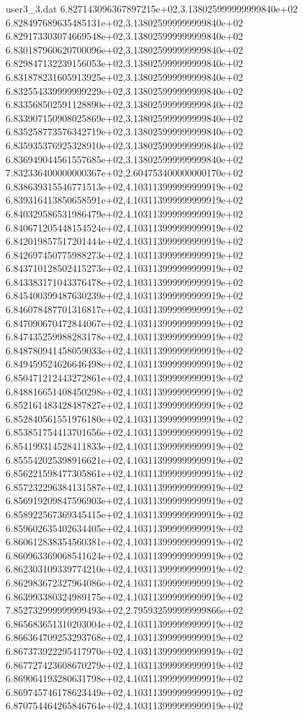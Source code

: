 \begin{filecontents}{user3_3.dat}
6.827143096367897215e+02,3.138025999999999840e+02
6.828497689635485131e+02,3.138025999999999840e+02
6.829173303074669548e+02,3.138025999999999840e+02
6.830187960620700096e+02,3.138025999999999840e+02
6.829847132239156053e+02,3.138025999999999840e+02
6.831878231605913925e+02,3.138025999999999840e+02
6.832554339999999229e+02,3.138025999999999840e+02
6.833568502591128890e+02,3.138025999999999840e+02
6.833907150908025869e+02,3.138025999999999840e+02
6.835258773576342719e+02,3.138025999999999840e+02
6.835935376925328910e+02,3.138025999999999840e+02
6.836949044561557685e+02,3.138025999999999840e+02
7.832336400000000367e+02,2.604753400000000170e+02
6.838639315546771513e+02,4.103113999999999919e+02
6.839316413850658591e+02,4.103113999999999919e+02
6.840329586531986479e+02,4.103113999999999919e+02
6.840671205448154524e+02,4.103113999999999919e+02
6.842019857517201444e+02,4.103113999999999919e+02
6.842697450775988273e+02,4.103113999999999919e+02
6.843710128502415273e+02,4.103113999999999919e+02
6.843383171043376478e+02,4.103113999999999919e+02
6.845400399487630239e+02,4.103113999999999919e+02
6.846078487701316817e+02,4.103113999999999919e+02
6.847090670472844067e+02,4.103113999999999919e+02
6.847435259988283178e+02,4.103113999999999919e+02
6.848780941458059033e+02,4.103113999999999919e+02
6.849459524626646498e+02,4.103113999999999919e+02
6.850471212443272861e+02,4.103113999999999919e+02
6.848816651408450298e+02,4.103113999999999919e+02
6.852161483428487827e+02,4.103113999999999919e+02
6.852840561551976180e+02,4.103113999999999919e+02
6.853851754413701656e+02,4.103113999999999919e+02
6.854199314528411833e+02,4.103113999999999919e+02
6.855542025398916621e+02,4.103113999999999919e+02
6.856221598477305861e+02,4.103113999999999919e+02
6.857232296384131587e+02,4.103113999999999919e+02
6.856919209847596903e+02,4.103113999999999919e+02
6.858922567369345415e+02,4.103113999999999919e+02
6.859602635402634405e+02,4.103113999999999919e+02
6.860612838354560381e+02,4.103113999999999919e+02
6.860963369068541624e+02,4.103113999999999919e+02
6.862303109339774210e+02,4.103113999999999919e+02
6.862983672327964086e+02,4.103113999999999919e+02
6.863993380324989175e+02,4.103113999999999919e+02
7.852732999999999493e+02,2.795932599999999866e+02
6.865683651310203004e+02,4.103113999999999919e+02
6.866364709253293768e+02,4.103113999999999919e+02
6.867373922295417970e+02,4.103113999999999919e+02
6.867727423608670279e+02,4.103113999999999919e+02
6.869064193280631798e+02,4.103113999999999919e+02
6.869745746178623449e+02,4.103113999999999919e+02
6.870754464265846764e+02,4.103113999999999919e+02

\end{filecontents}
